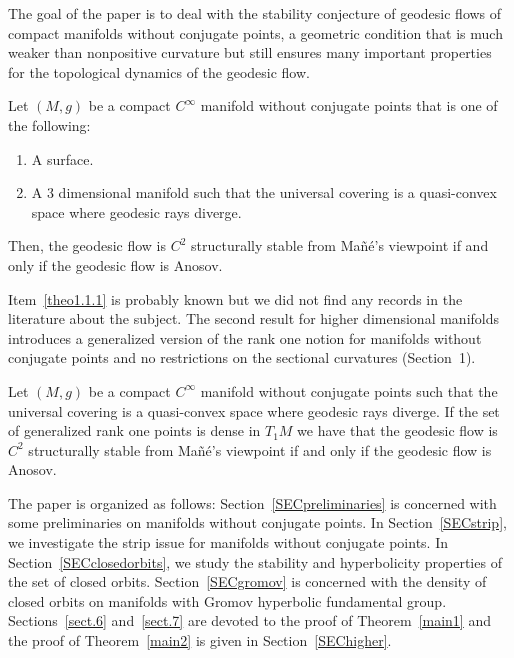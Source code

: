 \documentclass[AHL,Unicode,longabstracts,published]{cedram}
\begin{document}
The goal of the paper is to deal with the stability conjecture of geodesic flows of compact manifolds without conjugate points, a geometric condition that is much weaker than nonpositive curvature but still ensures many important properties for the topological dynamics of the geodesic flow.
\goodbreak

\begin{theo}\label{main1}
Let $(M,g)$ be a compact $C^{\infty}$ manifold without conjugate points that is one of the following:
\begin{enumerate}
\item \label{theo1.1.1} A surface.
\item \label{theo1.1.2} A 3 dimensional manifold such that the universal covering is a quasi-convex space where geodesic rays diverge.
\end{enumerate}
Then, the geodesic flow is $C^{2}$ structurally stable from Mañé's viewpoint if and only if the geodesic flow is Anosov.
\end{theo}

Item~\eqref{theo1.1.1} is probably known but we did not find any records in the literature about the subject. The second result for higher dimensional manifolds introduces a generalized version of the rank one notion for manifolds without conjugate points and no restrictions on the sectional curvatures (Section~1).

\begin{theo}\label{main2}
Let $(M,g)$ be a compact $C^{\infty}$ manifold without conjugate points such that the universal covering is a quasi-convex space where geodesic rays diverge. If the set of generalized rank one points is dense in $T_{1}M$ we have that the geodesic flow is $C^{2}$ structurally stable from Mañé's viewpoint if and only if the geodesic flow is Anosov.
\end{theo}

The paper is organized as follows: Section~\ref{SECpreliminaries} is concerned with some preliminaries on manifolds without conjugate points. In Section~\ref{SECstrip}, we investigate the strip issue for manifolds without conjugate points. In Section~\ref{SECclosedorbits}, we study the stability and hyperbolicity properties of the set of closed orbits. Section~\ref{SECgromov} is concerned with the density of closed orbits on manifolds with Gromov hyperbolic fundamental group. Sections~\ref{sect.6} and~\ref{sect.7} are devoted to the proof of Theorem~\ref{main1} and the proof of Theorem~\ref{main2} is given in Section~\ref{SEChigher}.
\end{document}
